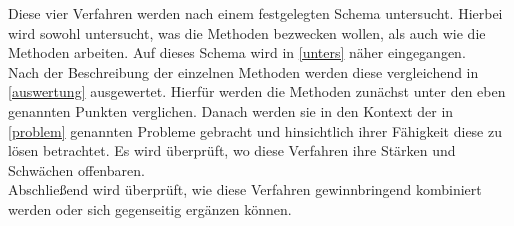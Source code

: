Diese vier Verfahren werden nach einem festgelegten Schema untersucht. Hierbei wird sowohl untersucht, was die Methoden bezwecken wollen, als auch wie die Methoden arbeiten. Auf dieses Schema wird in \ref{unters} n\"aher eingegangen. \\

Nach der Beschreibung der einzelnen Methoden werden diese vergleichend in \ref{auswertung} ausgewertet. Hierf\"ur werden die Methoden zun\"achst unter den eben genannten Punkten verglichen. Danach werden sie in den Kontext der in \ref{problem} genannten Probleme gebracht und hinsichtlich ihrer F\"ahigkeit diese zu l\"osen betrachtet. Es wird \"uberpr\"uft, wo diese Verfahren ihre St\"arken und Schw\"achen offenbaren. \\

Abschlie\ss{}end wird \"uberpr\"uft, wie diese Verfahren gewinnbringend kombiniert werden oder sich gegenseitig erg\"anzen k\"onnen. \\
